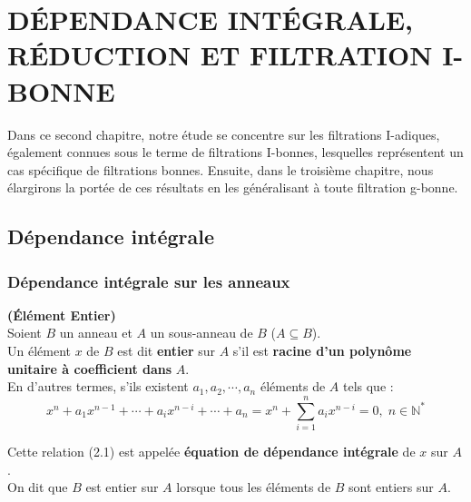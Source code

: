 \chapter{DÉPENDANCE INTÉGRALE, RÉDUCTION ET FILTRATION I-BONNE}

Dans ce second chapitre, notre étude se concentre sur les filtrations I-adiques, également connues sous le terme de filtrations I-bonnes, lesquelles représentent un cas spécifique de filtrations bonnes. Ensuite, dans le troisième chapitre, nous élargirons la portée de ces résultats en les généralisant à toute filtration g-bonne.

\section{Dépendance intégrale}
\subsection{Dépendance intégrale sur les anneaux}
\begin{madefinition}\textbf{(Élément Entier)}\cite{2} \\
	Soient $B$ un anneau et $A$ un sous-anneau de $B$ ($A \subseteq B$).\\
	Un élément $x$ de $B$ est dit \textbf{entier} sur $A$ s'il est \textbf{racine d'un polynôme unitaire à coefficient dans} $A$.\\
	En d'autres termes, s'ils existent $a_1, a_2, \cdots , a_n$ éléments de $A$ tels que :\\
	\begin{equation}
		x^n + a_1 x^{n-1} +\cdots+a_i x^{n-i} +\cdots + a_n = x^n + \sum_{i=1}^{n} a_i x^{n-i} = 0, \; n \in \mathbb{N^*}
	\end{equation}
	
	Cette relation (2.1) est appelée \textbf{équation de dépendance intégrale} de $x$ sur $A$.\\
	On dit que $B$ est entier sur $A$ lorsque tous les éléments de $B$ sont entiers sur $A$.
\end{madefinition}

